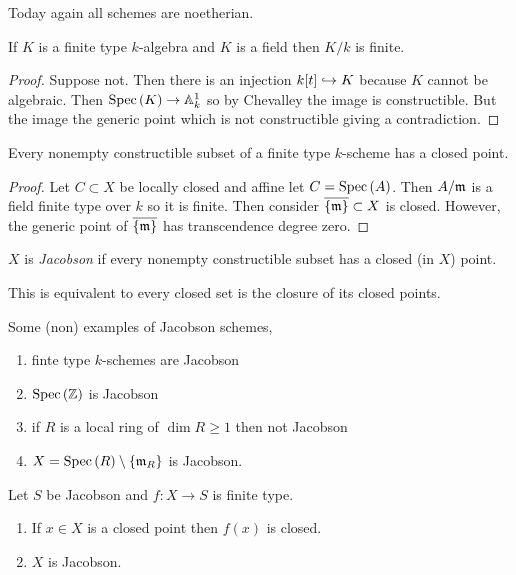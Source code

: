 \documentclass[12pt]{article}
\begin{document}
\begin{rmk}
Today again all schemes are noetherian.
\end{rmk}

\begin{prop}[Nullstellensatz]
If $K$ is a finite type $k$-algebra and $K$ is a field then $K/k$ is finite.
\end{prop}

\begin{proof}
Suppose not. Then there is an injection $k[t] \hookrightarrow K$ because $K$ cannot be algebraic. Then $\mathrm{Spec}\left( K \right) \to \mathbb{A}^1_k$ so by Chevalley the image is constructible. But the image the generic point which is not constructible giving a contradiction. 
\end{proof}

\begin{cor}
Every nonempty constructible subset of a finite type $k$-scheme has a closed point.
\end{cor}

\begin{proof}
Let $C \subset X$ be locally closed and affine let $C = \mathrm{Spec}\left( A \right)$. Then $A / \mathfrak{m}$ is a field finite type over $k$ so it is finite. Then consider $\overline{\{ \mathfrak{m} \}} \subset X$ is closed. However, the generic point of $\overline{ \{ \mathfrak{m} \} }$ has transcendence degree zero.  
\end{proof}

\begin{defn}
$X$ is \textit{Jacobson} if every nonempty constructible subset has a closed (in $X$) point.
\end{defn}

\begin{rmk}
This is equivalent to every closed set is the closure of its closed points.
\end{rmk}

\begin{example}
Some (non) examples of Jacobson schemes,
\begin{enumerate}
\item finte type $k$-schemes are Jacobson
\item $\mathrm{Spec}\left( \mathbb{Z} \right)$ is Jacobson
\item if $R$ is a local ring of $\dim{R} \ge 1$ then not Jacobson
\item $X = \mathrm{Spec}\left( R \right) \setminus \{ \mathfrak{m}_R \}$ is Jacobson.
\end{enumerate}
\end{example}

\begin{prop}
Let $S$ be Jacobson and $f : X \to S$ is finite type. 
\begin{enumerate}
\item If $x \in X$ is a closed point then $f(x)$ is closed.
\item $X$ is Jacobson.
\end{enumerate}
\end{prop}
\end{document}
